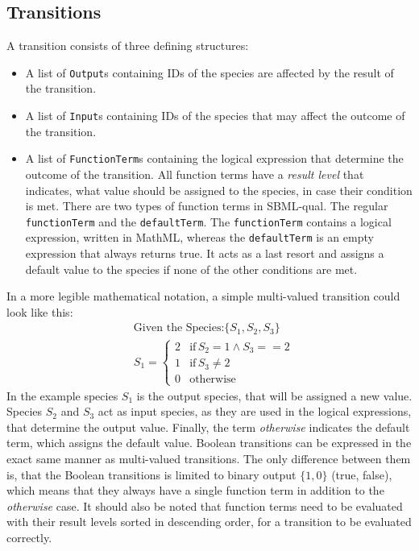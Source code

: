 \subsection{Transitions}
A transition consists of three defining structures:
\begin{itemize}
    \item A list of \texttt{Output}s containing IDs of the species are affected by the result of the transition.
    \item A list of \texttt{Input}s containing IDs of the species that may affect the outcome of the transition.
    \item A list of \texttt{FunctionTerm}s containing the logical expression that determine the outcome of the transition. All function terms have a \emph{result level} that indicates, what value should be assigned to the species, in case their condition is met. There are two types of function terms in SBML-qual. The regular \texttt{functionTerm} and the \texttt{defaultTerm}. The \texttt{functionTerm} contains a logical expression, written in MathML\*, whereas the \texttt{defaultTerm} is an empty expression that always returns true. It acts as a last resort and assigns a default value to the species if none of the other conditions are met.
\end{itemize}
In a more legible mathematical notation,  a simple multi-valued transition could look like this:
\begin{align*}
    &\text{Given the Species:} \{S_1,S_2,S_3\} \\
    &S_1 = \begin{cases}
    2 & \text{if}\,S_2 = 1 \land S_3 == 2 \\
    1 & \text{if}\,S_3 \neq 2 \\
    0 & \text{otherwise}
    \end{cases}
\end{align*}
In the example species $S_1$ is the output species, that will be assigned a new value. Species $S_2$ and $S_3$ act as input species, as they are used in the logical expressions, that determine the output value. Finally, the term \emph{otherwise} indicates the default term, which assigns the default value.
Boolean transitions can be expressed in the exact same manner as multi-valued transitions. The only difference between them is, that the Boolean transitions is limited to binary output $\{1,0\}$ (true, false), which means that they always have a single function term in addition to the \emph{otherwise} case. It should also be noted that function terms need to be evaluated with their result levels sorted in descending order, for a transition to be evaluated correctly.
